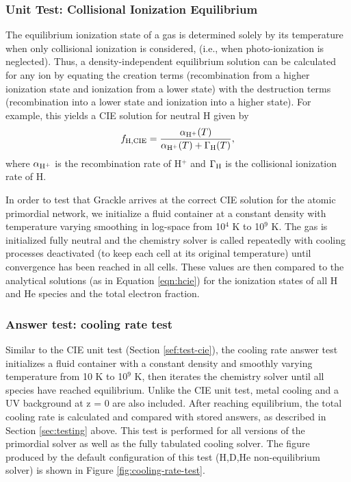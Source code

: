 \subsubsection{Unit Test: Collisional Ionization Equilibrium}
\label{sec:test-cie}

The equilibrium ionization state of a gas is determined solely by its
temperature when only collisional ionization is considered, (i.e.,
when photo-ionization is neglected).  Thus, a density-independent
equilibrium solution can be calculated for any ion by equating the
creation terms (recombination from a higher ionization state and 
ionization from a lower state) with the destruction terms
(recombination into a lower state and ionization into a higher
state).  For example, this yields a CIE solution for neutral H given
by
\begin{equation} \label{eqn:hcie}
f_{\rm H,CIE} = \frac{\alpha_{\rm H^{+}}(T)}{\alpha_{\rm H^{+}}(T) +
  \Gamma_{\rm H}(T)},
\end{equation}
where $\alpha_{\rm H^{+}}$ is the recombination rate of H$^{+}$ and
$\Gamma_{\rm H}$ is the collisional ionization rate of H.

In order to test that Grackle arrives at the correct CIE solution
for the atomic primordial network, we initialize a fluid container at
a constant density with temperature varying smoothing in log-space
from 10$^{4}$ K to 10$^{9}$ K.  The gas is initialized fully neutral
and the chemistry solver is called repeatedly with cooling processes
deactivated (to keep each cell at its original temperature) until
convergence has been reached in all cells.  These values are then
compared to the analytical solutions (as in Equation \ref{eqn:hcie})
for the ionization states of all H and He species and the total
electron fraction.

\subsubsection{Answer test: cooling rate test}
\label{sec:cooling-rate-test}

Similar to the CIE unit test (Section \ref{sef:test-cie}), the cooling
rate answer test initializes a fluid container with a constant density
and smoothly varying temperature from 10 K to 10$^{9}$ K, then
iterates the chemistry solver until all species have reached
equilibrium.  Unlike the CIE unit test, metal cooling and a
\citet{2012ApJ...746..125H} UV background at z = 0 are also included.
After reaching equilibrium, the total cooling rate is calculated and
compared with stored answers, as described in Section
\ref{sec:testing} above.  This test is performed for all versions of
the primordial solver as well as the fully tabulated cooling solver.
The figure produced by the default configuration of this test
(H,D,He non-equilibrium solver) is shown in Figure
\ref{fig:cooling-rate-test}.

